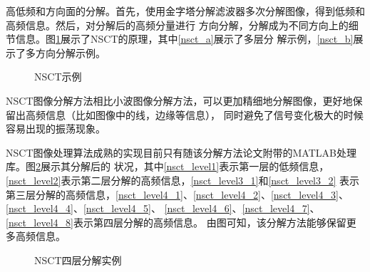 \documentclass{xduugthesis}
\begin{document}
高低频和方向面的分解。首先，使用金字塔分解滤波器多次分解图像，得到低频和高频信息。然后，对分解后的高频分量进行
方向分解，分解成为不同方向上的细节信息。图\ref{NSCT_Demo}展示了NSCT的原理，其中\ref{nsct_a}展示了多层分
解示例，\ref{nsct_b}展示了多方向分解示例。\par
\begin{figure}[ht!]
	\centering
	\caption{NSCT示例}\label{NSCT_Demo}
\end{figure}
NSCT图像分解方法相比小波图像分解方法，可以更加精细地分解图像，更好地保留出高频信息（比如图像中的线，边缘等信息），
同时避免了信号变化极大的时候容易出现的振荡现象。\par
NSCT图像处理算法成熟的实现目前只有随该分解方法论文附带的MATLAB处理库\cite{NSCT_MATLAB}。图\ref{NSCT_Solution_Image}展示其分解后的
状况，其中\ref{nsct_level1}表示第一层的低频信息，\ref{nsct_level2}表示第二层分解的高频信息，\ref{nsct_level3_1}和\ref{nsct_level3_2}
表示第三层分解的高频信息，\ref{nsct_level4_1}、\ref{nsct_level4_2}、\ref{nsct_level4_3}、\ref{nsct_level4_4}、\ref{nsct_level4_5}、
\ref{nsct_level4_6}、\ref{nsct_level4_7}、\ref{nsct_level4_8}表示第四层分解的高频信息。
由图可知，该分解方法能够保留更多高频信息。\par
\begin{figure}[ht!]
	\centering
	\caption{NSCT四层分解实例}\label{NSCT_Solution_Image}
\end{figure}
\end{document}
